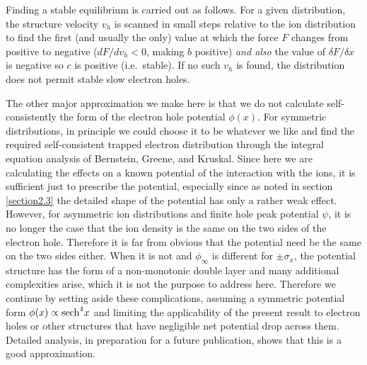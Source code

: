 \documentclass[pre]{revtex4-2}
\begin{document}
Finding a stable equilibrium is carried out as follows.  For a given
distribution, the structure velocity $v_h$ is scanned in small steps
relative to the ion distribution to find the first (and usually the
only) value at which the force $F$ changes from positive to negative
($dF/dv_h<0$, making $b$ positive) \emph{and also} the value of
$\delta F/\delta x$ is negative so $c$ is positive (i.e.\ stable). If
no such $v_h$ is found, the distribution does not permit stable slow
electron holes. 

The other major approximation we make here is that we do not calculate
self-consistently the form of the electron hole potential
$\phi(x)$. For symmetric distributions, in principle we could choose
it to be whatever we like and find the required self-consistent
trapped electron distribution through the integral equation analysis
of Bernstein, Greene, and
Kruskal\cite{Bernstein1957,Hutchinson2017}. Since here we are
calculating the effects on a known potential of the interaction with
the ions, it is sufficient just to prescribe the potential, especially
since as noted in section \ref{section2.3} the detailed shape of the
potential has only a rather weak effect. However, for asymmetric ion
distributions and finite hole peak potential $\psi$, it is no longer
the case that the ion density is the same on the two sides of the
electron hole. Therefore it is far from obvious that the potential
need be the same on the two sides either. When it is not and
$\phi_\infty$ is different for $\pm\sigma_x$, the potential structure
has the form of a non-monotonic double layer\cite{Raadu1989} and many
additional complexities arise, which it is not the purpose to address
here. Therefore we continue by setting aside these complications,
assuming a symmetric potential form $\phi(x)\propto{\rm sech}^4x$ and
limiting the applicability of the present result to electron holes or
other structures that have negligible net potential drop across them.
Detailed analysis, in preparation for a future publication, shows that
this is a good approximation.
\end{document}
